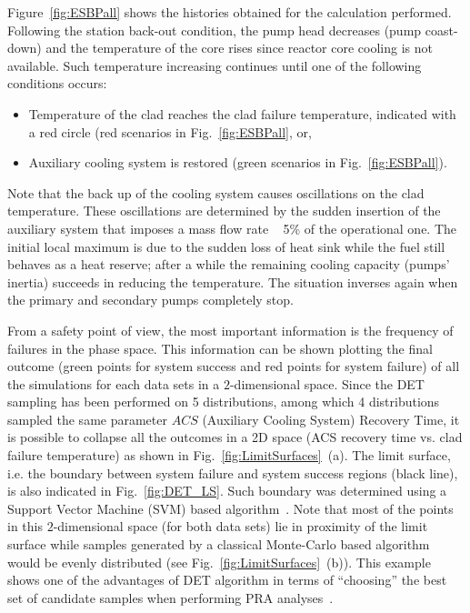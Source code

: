 Figure~\ref{fig:ESBPall} shows the histories obtained for the calculation performed.
Following the station back-out condition, the pump head decreases (pump coast-down) and the temperature of the core rises since reactor core cooling is not available. Such temperature increasing continues until one of the following conditions occurs:
\vspace{-5mm}
\begin{itemize}
\item Temperature of the clad reaches the clad failure temperature, indicated with a red circle (red scenarios in Fig.~\ref{fig:ESBPall}, or,
\item Auxiliary cooling system is restored (green scenarios in Fig.~\ref{fig:ESBPall}).
\end{itemize}
\vspace{-5mm}

Note that the back up of the cooling system causes oscillations on the clad temperature. These oscillations are determined by the sudden insertion of the auxiliary system that imposes a mass flow rate ~ 5\% of the operational one. The initial local maximum is due to the sudden loss of heat sink while the fuel still behaves as a heat reserve; after a while the remaining cooling capacity (pumps’ inertia) succeeds in reducing the temperature. The situation inverses again when the primary and secondary pumps completely stop. 

From a safety point of view, the most important information is the frequency of failures in the phase space. This information can be shown plotting the final outcome (green points for system success and red points for system failure) of all the simulations for each data sets in a $2$-dimensional space. Since the DET sampling has been performed on 5 distributions, among which 4 distributions sampled the same parameter $ACS$ (Auxiliary Cooling System) Recovery Time, it is possible to collapse all the outcomes in a 2D space (ACS recovery time vs. clad failure temperature) as shown in Fig.~\ref{fig:LimitSurfaces}~(a).
The limit surface, i.e. the boundary between system failure and system success regions (black line), is also indicated in Fig.~\ref{fig:DET_LS}. Such boundary was determined using a Support Vector Machine (SVM) based algorithm~\cite{mandelliANS_RISMC}.
Note that most of the points in this $2$-dimensional space (for both data sets) lie in proximity  of the limit surface while samples generated by a classical Monte-Carlo based algorithm would be evenly distributed (see Fig.~\ref{fig:LimitSurfaces}~(b)). 
This example shows one of the advantages of DET algorithm in terms of ``choosing'' the best set of candidate samples when performing PRA analyses~\cite{alfonsiPSA}.

